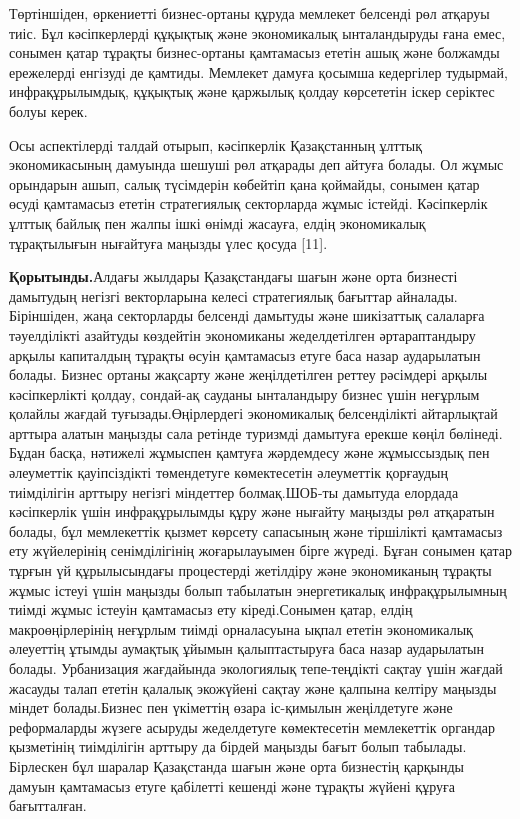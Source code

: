 Төртіншіден, өркениетті бизнес-ортаны құруда мемлекет белсенді рөл
атқаруы тиіс. Бұл кәсіпкерлерді құқықтық және экономикалық ынталандыруды
ғана емес, сонымен қатар тұрақты бизнес-ортаны қамтамасыз ететін ашық
және болжамды ережелерді енгізуді де қамтиды. Мемлекет дамуға қосымша
кедергілер тудырмай, инфрақұрылымдық, құқықтық және қаржылық қолдау
көрсететін іскер серіктес болуы керек.

Осы аспектілерді талдай отырып, кәсіпкерлік Қазақстанның ұлттық
экономикасының дамуында шешуші рөл атқарады деп айтуға болады. Ол жұмыс
орындарын ашып, салық түсімдерін көбейтіп қана қоймайды, сонымен қатар
өсуді қамтамасыз ететін стратегиялық секторларда жұмыс істейді.
Кәсіпкерлік ұлттық байлық пен жалпы ішкі өнімді жасауға, елдің
экономикалық тұрақтылығын нығайтуға маңызды үлес қосуда {[}11{]}.

{\bfseries Қорытынды.}Алдағы жылдары Қазақстандағы шағын және орта бизнесті
дамытудың негізгі векторларына келесі стратегиялық бағыттар айналады.
Біріншіден, жаңа секторларды белсенді дамытуды және шикізаттық салаларға
тәуелділікті азайтуды көздейтін экономиканы жеделдетілген әртараптандыру
арқылы капиталдың тұрақты өсуін қамтамасыз етуге баса назар аударылатын
болады. Бизнес ортаны жақсарту және жеңілдетілген реттеу рәсімдері
арқылы кәсіпкерлікті қолдау, сондай-ақ сауданы ынталандыру бизнес үшін
неғұрлым қолайлы жағдай туғызады.Өңірлердегі экономикалық белсенділікті
айтарлықтай арттыра алатын маңызды сала ретінде туризмді дамытуға ерекше
көңіл бөлінеді. Бұдан басқа, нәтижелі жұмыспен қамтуға жәрдемдесу және
жұмыссыздық пен әлеуметтік қауіпсіздікті төмендетуге көмектесетін
әлеуметтік қорғаудың тиімділігін арттыру негізгі міндеттер болмақ.ШОБ-ты
дамытуда елордада кәсіпкерлік үшін инфрақұрылымды құру және нығайту
маңызды рөл атқаратын болады, бұл мемлекеттік қызмет көрсету сапасының
және тіршілікті қамтамасыз ету жүйелерінің сенімділігінің жоғарылауымен
бірге жүреді. Бұған сонымен қатар тұрғын үй құрылысындағы процестерді
жетілдіру және экономиканың тұрақты жұмыс істеуі үшін маңызды болып
табылатын энергетикалық инфрақұрылымның тиімді жұмыс істеуін қамтамасыз
ету кіреді.Сонымен қатар, елдің макроөңірлерінің неғұрлым тиімді
орналасуына ықпал ететін экономикалық әлеуеттің ұтымды аумақтық ұйымын
қалыптастыруға баса назар аударылатын болады. Урбанизация жағдайында
экологиялық тепе-теңдікті сақтау үшін жағдай жасауды талап ететін
қалалық экожүйені сақтау және қалпына келтіру маңызды міндет
болады.Бизнес пен үкіметтің өзара іс-қимылын жеңілдетуге және
реформаларды жүзеге асыруды жеделдетуге көмектесетін мемлекеттік
органдар қызметінің тиімділігін арттыру да бірдей маңызды бағыт болып
табылады. Бірлескен бұл шаралар Қазақстанда шағын және орта бизнестің
қарқынды дамуын қамтамасыз етуге қабілетті кешенді және тұрақты жүйені
құруға бағытталған.


